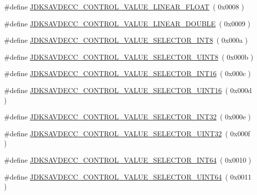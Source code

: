 \begin{DoxyCompactItemize}
\item 
\#define \hyperlink{group__aem__control__value_ga9e35c190c740a4e836f567169d2ababb}{J\+D\+K\+S\+A\+V\+D\+E\+C\+C\+\_\+\+C\+O\+N\+T\+R\+O\+L\+\_\+\+V\+A\+L\+U\+E\+\_\+\+L\+I\+N\+E\+A\+R\+\_\+\+F\+L\+O\+AT}~( 0x0008 )
\item 
\#define \hyperlink{group__aem__control__value_ga8c34f1e1cf6bd237e8d09aa4ce568a9a}{J\+D\+K\+S\+A\+V\+D\+E\+C\+C\+\_\+\+C\+O\+N\+T\+R\+O\+L\+\_\+\+V\+A\+L\+U\+E\+\_\+\+L\+I\+N\+E\+A\+R\+\_\+\+D\+O\+U\+B\+LE}~( 0x0009 )
\item 
\#define \hyperlink{group__aem__control__value_ga8fc9e0060ac05a23b119ba2a8e7f09c3}{J\+D\+K\+S\+A\+V\+D\+E\+C\+C\+\_\+\+C\+O\+N\+T\+R\+O\+L\+\_\+\+V\+A\+L\+U\+E\+\_\+\+S\+E\+L\+E\+C\+T\+O\+R\+\_\+\+I\+N\+T8}~( 0x000a )
\item 
\#define \hyperlink{group__aem__control__value_ga34e4486803bf0689be1d2a6fdf4a13c4}{J\+D\+K\+S\+A\+V\+D\+E\+C\+C\+\_\+\+C\+O\+N\+T\+R\+O\+L\+\_\+\+V\+A\+L\+U\+E\+\_\+\+S\+E\+L\+E\+C\+T\+O\+R\+\_\+\+U\+I\+N\+T8}~( 0x000b )
\item 
\#define \hyperlink{group__aem__control__value_gaa9bd32bb75f5822ca4636605117129dd}{J\+D\+K\+S\+A\+V\+D\+E\+C\+C\+\_\+\+C\+O\+N\+T\+R\+O\+L\+\_\+\+V\+A\+L\+U\+E\+\_\+\+S\+E\+L\+E\+C\+T\+O\+R\+\_\+\+I\+N\+T16}~( 0x000c )
\item 
\#define \hyperlink{group__aem__control__value_gaf2b67d199bc86800c43ec6fae26c8118}{J\+D\+K\+S\+A\+V\+D\+E\+C\+C\+\_\+\+C\+O\+N\+T\+R\+O\+L\+\_\+\+V\+A\+L\+U\+E\+\_\+\+S\+E\+L\+E\+C\+T\+O\+R\+\_\+\+U\+I\+N\+T16}~( 0x000d )
\item 
\#define \hyperlink{group__aem__control__value_ga47881ff87370da9bbf1691bf8281a76b}{J\+D\+K\+S\+A\+V\+D\+E\+C\+C\+\_\+\+C\+O\+N\+T\+R\+O\+L\+\_\+\+V\+A\+L\+U\+E\+\_\+\+S\+E\+L\+E\+C\+T\+O\+R\+\_\+\+I\+N\+T32}~( 0x000e )
\item 
\#define \hyperlink{group__aem__control__value_ga681879e296f1d9d96664d54ca8394677}{J\+D\+K\+S\+A\+V\+D\+E\+C\+C\+\_\+\+C\+O\+N\+T\+R\+O\+L\+\_\+\+V\+A\+L\+U\+E\+\_\+\+S\+E\+L\+E\+C\+T\+O\+R\+\_\+\+U\+I\+N\+T32}~( 0x000f )
\item 
\#define \hyperlink{group__aem__control__value_ga004bcc7d8f5b1a0ed790c96e6fb50846}{J\+D\+K\+S\+A\+V\+D\+E\+C\+C\+\_\+\+C\+O\+N\+T\+R\+O\+L\+\_\+\+V\+A\+L\+U\+E\+\_\+\+S\+E\+L\+E\+C\+T\+O\+R\+\_\+\+I\+N\+T64}~( 0x0010 )
\item 
\#define \hyperlink{group__aem__control__value_ga80e8b47d3760cc4e87c801a54ec9ae67}{J\+D\+K\+S\+A\+V\+D\+E\+C\+C\+\_\+\+C\+O\+N\+T\+R\+O\+L\+\_\+\+V\+A\+L\+U\+E\+\_\+\+S\+E\+L\+E\+C\+T\+O\+R\+\_\+\+U\+I\+N\+T64}~( 0x0011 )

\end{DoxyCompactItemize}
